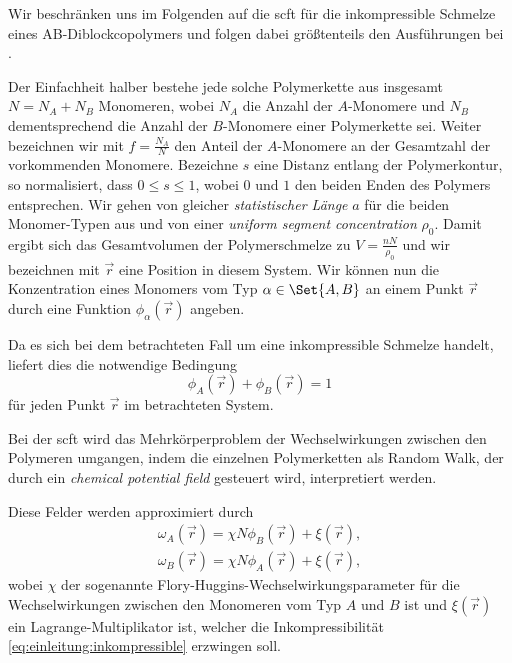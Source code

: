 Wir beschränken uns im Folgenden auf die \ac{scft} für die inkompressible Schmelze eines AB-Diblockcopolymers und folgen dabei größtenteils den Ausführungen bei \textcite{Stasiak:2011ba,Matsen:2002do,Ceniceros:2006is}.

Der Einfachheit halber bestehe jede solche Polymerkette aus insgesamt $N = N_{A} + N_{B}$ Monomeren, wobei $N_{A}$ die Anzahl der $A$-Monomere und $N_{B}$ dementsprechend die Anzahl der $B$-Monomere einer Polymerkette sei.
Weiter bezeichnen wir mit $f = \frac{N_{A}}{N}$ den Anteil der $A$-Monomere an der Gesamtzahl der vorkommenden Monomere.
Bezeichne $s$ eine Distanz entlang der Polymerkontur, so normalisiert, dass $0 \leq s \leq 1$, wobei $0$ und $1$ den beiden Enden des Polymers entsprechen.
Wir gehen von gleicher \emph{statistischer Länge} $a$ für die beiden Monomer-Typen aus und von einer \emph{uniform segment concentration} $\rho_{0}$.
Damit ergibt sich das Gesamtvolumen der Polymerschmelze zu $V = \frac{nN}{\rho_{0}}$ und wir bezeichnen mit $\vec{r}$ eine Position in diesem System.
Wir können nun die Konzentration eines Monomers vom Typ $\alpha \in \Set{A, B}$ an einem Punkt $\vec{r}$ durch eine Funktion $\phi_{\alpha}(\vec{r})$ angeben.

Da es sich bei dem betrachteten Fall um eine inkompressible Schmelze handelt,
liefert dies die notwendige Bedingung
\begin{equation}
\label{eq:einleitung:inkompressible}
    \phi_{A}(\vec{r}) + \phi_{B}(\vec{r}) = 1
\end{equation}
für jeden Punkt $\vec{r}$ im betrachteten System.

Bei der \ac{scft} wird das Mehrkörperproblem der Wechselwirkungen zwischen den Polymeren umgangen, indem die einzelnen Polymerketten als Random Walk, der durch ein \emph{chemical potential field} gesteuert wird, interpretiert werden.

Diese Felder werden approximiert durch
\begin{equation}
\label{eq:einleitung:felder}
    \begin{aligned}
        \omega_{A}(\vec{r}) = \chi N \phi_{B}(\vec{r}) + \xi(\vec{r}),\\
        \omega_{B}(\vec{r}) = \chi N \phi_{A}(\vec{r}) + \xi(\vec{r}),
    \end{aligned}
\end{equation}
wobei $\chi$ der sogenannte Flory-Huggins-Wechselwirkungsparameter für die Wechselwirkungen zwischen den Monomeren vom Typ $A$ und $B$ ist und $\xi(\vec{r})$ ein Lagrange-Multiplikator ist, welcher die Inkompressibilität \eqref{eq:einleitung:inkompressible} erzwingen soll.

